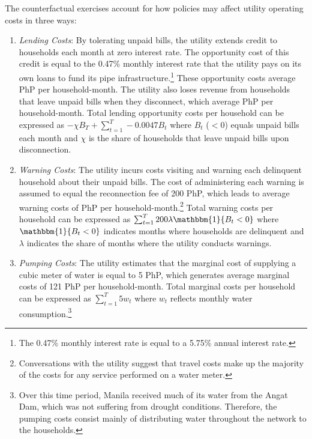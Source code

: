 \documentclass[12pt,table]{article}
\begin{document}
The counterfactual exercises account for how policies may affect utility operating costs in three ways:
\begin{enumerate}
	\item \textit{Lending Costs}:  By tolerating unpaid bills, the utility extends credit to households each month at zero interest rate.  The opportunity cost of this credit is equal to the 0.47\% monthly interest rate that the utility pays on its own loans to fund its pipe infrastructure.\footnote{The 0.47\% monthly interest rate is equal to a 5.75\% annual interest rate.}  These opportunity costs average PhP per household-month.  The utility also loses revenue from households that leave unpaid bills when they disconnect, which average PhP per household-month.  Total lending opportunity costs per household can be expressed as $ - \chi B_T + \sum_{t=1}^{T}  - 0.0047 B_t $ where $B_t$ ($<0$) equals unpaid bills each month and $\chi$ is the share of households that leave unpaid bills upon disconnection.

	\item \textit{Warning Costs}:  The utility incurs costs visiting and warning each delinquent household about their unpaid bills.  The cost of administering each warning is assumed to equal the reconnection fee of 200 PhP, which leads to average warning costs of PhP per household-month.\footnote{Conversations with the utility suggest that travel costs make up the majority of the costs for any service performed on a water meter.}  Total warning costs per household can be expressed as  $\sum_{t=1}^{T} 200 \lambda \mathbbm{1}\{B_t < 0 \}  $ where $ \mathbbm{1}\{B_t < 0 \}$ indicates months where households are delinquent and $\lambda$ indicates the share of months where the utility conducts warnings.

	\item \textit{Pumping Costs}: The utility estimates that the marginal cost of supplying a cubic meter of water is equal to 5 PhP, which generates average marginal costs of 121 PhP per household-month.  Total marginal costs per household can be expressed as $\sum_{t=1}^{T} 5 w_t  $ where $w_t$ reflects monthly water consumption.\footnote{Over this time period, Manila received much of its water from the Angat Dam, which was not suffering from drought conditions.  Therefore, the pumping costs consist mainly of distributing water throughout the network to the households.}
\end{enumerate}
\end{document}
